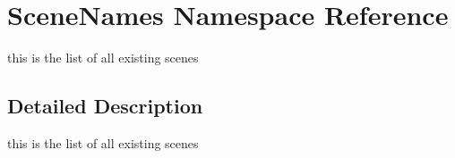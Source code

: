 \hypertarget{namespace_scene_names}{}\section{Scene\+Names Namespace Reference}
\label{namespace_scene_names}


this is the list of all existing scenes  




\subsection{Detailed Description}
this is the list of all existing scenes 
